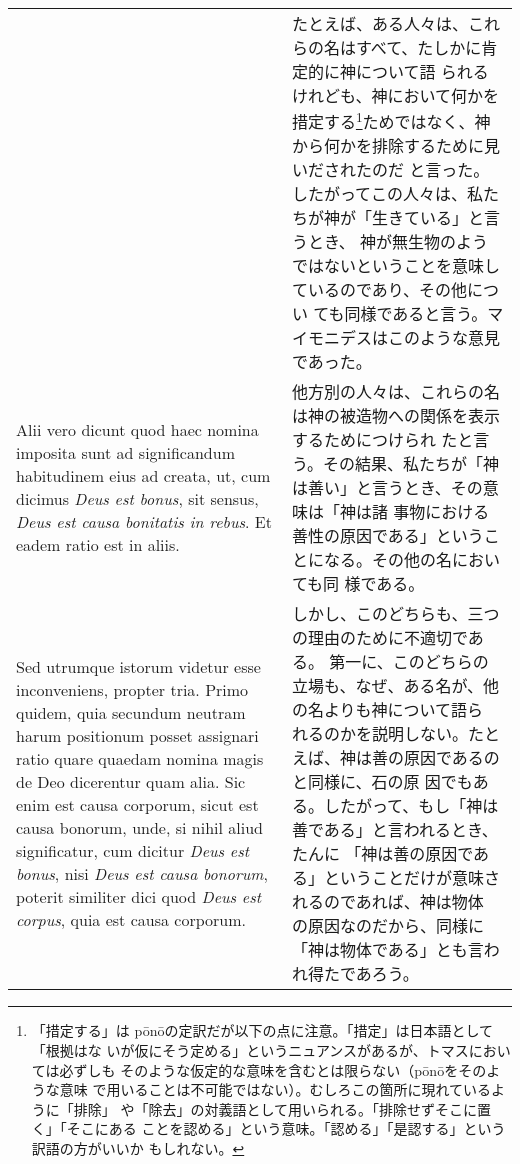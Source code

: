 \documentclass[10pt]{jsarticle} %
\begin{document}
\begin{longtable}{p{21em}p{21em}}
&

たとえば、ある人々は、これらの名はすべて、たしかに肯定的に神について語
られるけれども、神において何かを措定する\footnote{「措定する」は
p\={o}n\={o}の定訳だが以下の点に注意。「措定」は日本語として「根拠はな
いが仮にそう定める」というニュアンスがあるが、トマスにおいては必ずしも
そのような仮定的な意味を含むとは限らない（p\={o}n\={o}をそのような意味
で用いることは不可能ではない）。むしろこの箇所に現れているように「排除」
や「除去」の対義語として用いられる。「排除せずそこに置く」「そこにある
ことを認める」という意味。「認める」「是認する」という訳語の方がいいか
もしれない。}ためではなく、神から何かを排除するために見いだされたのだ
と言った。したがってこの人々は、私たちが神が「生きている」と言うとき、
神が無生物のようではないということを意味しているのであり、その他につい
ても同様であると言う。マイモニデスはこのような意見であった。


\\

Alii vero dicunt quod haec nomina imposita sunt ad significandum
habitudinem eius ad creata, ut, cum dicimus {\it Deus est bonus}, sit sensus,
{\it Deus est causa bonitatis in rebus}. Et eadem ratio est in aliis. 

&

他方別の人々は、これらの名は神の被造物への関係を表示するためにつけられ
たと言う。その結果、私たちが「神は善い」と言うとき、その意味は「神は諸
事物における善性の原因である」ということになる。その他の名においても同
様である。


\\

Sed utrumque istorum videtur esse inconveniens, propter
tria. Primo quidem, quia secundum neutram harum positionum posset
assignari ratio quare quaedam nomina magis de Deo dicerentur quam
alia. Sic enim est causa corporum, sicut est causa bonorum, unde, si
nihil aliud significatur, cum dicitur {\it Deus est bonus}, nisi {\it Deus est
causa bonorum}, poterit similiter dici quod {\it Deus est corpus}, quia est
causa corporum. 

&

しかし、このどちらも、三つの理由のために不適切である。
第一に、このどちらの立場も、なぜ、ある名が、他の名よりも神について語ら
 れるのかを説明しない。たとえば、神は善の原因であるのと同様に、石の原
 因でもある。したがって、もし「神は善である」と言われるとき、たんに
 「神は善の原因である」ということだけが意味されるのであれば、神は物体
 の原因なのだから、同様に「神は物体である」とも言われ得たであろう。



\end{longtable}
\end{document}
